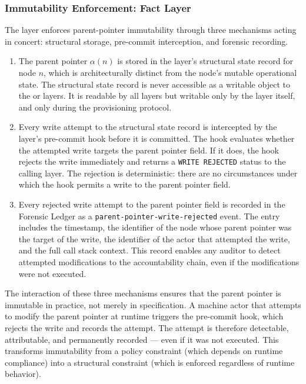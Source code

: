 \subsubsection{Immutability Enforcement: Fact Layer}\label{sec:parent-pointer-fact-layer}

The \fact{} layer enforces parent-pointer immutability through three mechanisms acting in concert: structural storage, pre-commit interception, and forensic recording.

\begin{enumerate}
\item[(\textit{Structural Storage})] The parent pointer $\alpha(n)$ is stored in the \fact{} layer's structural state record for node $n$, which is architecturally distinct from the node's mutable operational state. The structural state record is never accessible as a writable object to the \bounds{} or \purpose{} layers. It is readable by all layers but writable only by the \fact{} layer itself, and only during the provisioning protocol.

\item[(\textit{Pre-commit Interception})] Every write attempt to the structural state record is intercepted by the \fact{} layer's pre-commit hook before it is committed. The hook evaluates whether the attempted write targets the parent pointer field. If it does, the hook rejects the write immediately and returns a \texttt{WRITE\ REJECTED} status to the calling layer. The rejection is deterministic: there are no circumstances under which the hook permits a write to the parent pointer field.

\item[(\textit{Forensic Recording})] Every rejected write attempt to the parent pointer field is recorded in the Forensic Ledger as a \texttt{parent-pointer-write-rejected} event. The entry includes the timestamp, the identifier of the node whose parent pointer was the target of the write, the identifier of the actor that attempted the write, and the full call stack context. This record enables any auditor to detect attempted modifications to the accountability chain, even if the modifications were not executed.
\end{enumerate}

The interaction of these three mechanisms ensures that the parent pointer is immutable in practice, not merely in specification. A machine actor that attempts to modify the parent pointer at runtime triggers the pre-commit hook, which rejects the write and records the attempt. The attempt is therefore detectable, attributable, and permanently recorded --- even if it was not executed. This transforms immutability from a policy constraint (which depends on runtime compliance) into a structural constraint (which is enforced regardless of runtime behavior).

